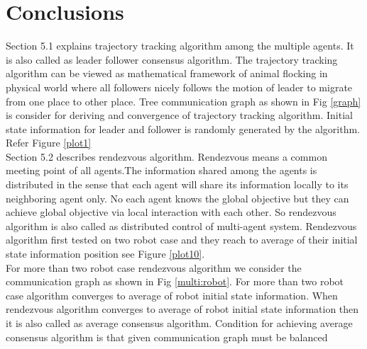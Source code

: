 \documentclass[twocolumn]{IETEJR}
\begin{document}
\section{Conclusions}
Section 5.1 explains trajectory tracking algorithm among the multiple agents. It is also called as leader follower consensus algorithm. The trajectory tracking algorithm can be viewed as mathematical framework of animal flocking in physical world where all followers nicely follows the motion of leader to migrate from one place to other place. Tree communication graph as shown in Fig \ref{graph} is consider for deriving and convergence of trajectory tracking algorithm. Initial state information for leader and follower is randomly generated by the algorithm. Refer Figure \ref{plot1}\\ 

Section 5.2 describes rendezvous algorithm. Rendezvous means a common meeting point of all agents.The information shared among the agents is distributed in the sense that each agent will share its information locally to its neighboring agent only. No each agent knows the global objective but they can achieve global objective via local interaction with each other. So rendezvous algorithm is also called as distributed control of multi-agent system. Rendezvous algorithm first tested on two robot case and they reach to average of their initial state information position see Figure \ref{plot10}.\\

For more than two robot case rendezvous algorithm we consider the communication graph as shown in Fig \ref{multi:robot}. For more than two robot case algorithm converges to average of robot initial state information. When rendezvous algorithm converges to average of robot initial state information then it is also called as average consensus algorithm. Condition for achieving average consensus algorithm is that given communication graph must be balanced 
\end{document}
